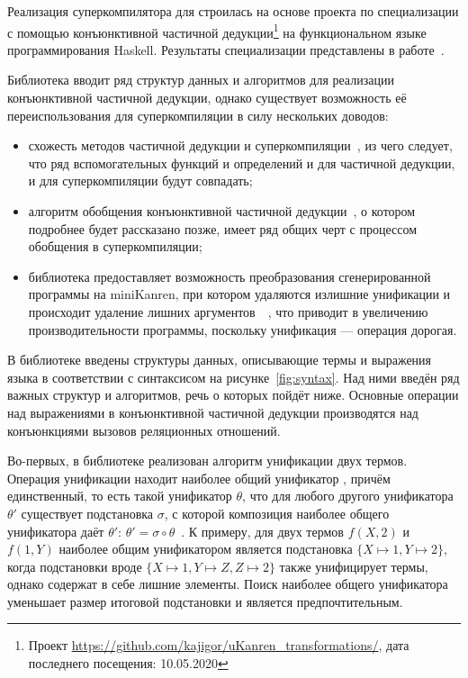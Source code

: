 Реализация суперкомпилятора для \ukanren строилась на основе проекта по специализации \ukanren с помощью конъюнктивной частичной
дедукции\footnote{Проект \url{https://github.com/kajigor/uKanren_transformations/}, дата последнего посещения: 10.05.2020} на функциональном языке программирования Haskell.
Результаты специализации \ukanren представлены в работе~\cite{lozov}.

Библиотека вводит ряд структур данных и алгоритмов для реализации конъюнктивной частичной дедукции,
однако существует возможность её переиспользования для суперкомпиляции в силу нескольких доводов:
\begin{itemize}
\item схожесть методов частичной дедукции и суперкомпиляции~\cite{pdAndDriving},
      из чего следует, что ряд вспомогательных функций и определений и для частичной дедукции, и для суперкомпиляции
      будут совпадать;
\item алгоритм обобщения конъюнктивной частичной дедукции~\cite{cpd}, о котором подробнее будет рассказано позже,
      имеет ряд общих черт с процессом обобщения в суперкомпиляции;
\item библиотека предоставляет возможность преобразования сгенерированной программы
      на miniKanren, при котором удаляются излишние унификации и
      происходит удаление лишних аргументов~~\cite{raf},
      что приводит в увеличению производительности программы, поскольку унификация --- операция дорогая.
\end{itemize}

В библиотеке введены структуры данных, описывающие термы и выражения языка
в соответствии с синтаксисом \ukanren на рисунке~\ref{fig:syntax}.
Над ними введён ряд важных структур и алгоритмов, речь о которых пойдёт ниже.
Основные операции над выражениями в конъюнктивной частичной дедукции производятся над конъюнкциями
вызовов реляционных отношений.


Во-первых, в библиотеке реализован алгоритм унификации двух термов.
Операция унификации находит наиболее общий унификатор ,
причём единственный, то есть такой
унификатор $\theta$, что для любого другого унификатора $\theta'$ существует подстановка $\sigma$,
с которой композиция наиболее общего унификатора даёт $\theta'$: $\theta' = \sigma \circ \theta$~\cite{unification}.
К примеру, для двух термов $f(X, 2)$ и $f(1, Y)$ наиболее общим унификатором является
подстановка $\{ X \mapsto 1, Y \mapsto 2 \}$, когда подстановки вроде
$\{ X \mapsto 1, Y \mapsto Z, Z \mapsto 2 \}$ также унифицирует термы, однако
содержат в себе лишние элементы. 
Поиск наиболее общего унификатора уменьшает размер итоговой подстановки и является предпочтительным.

